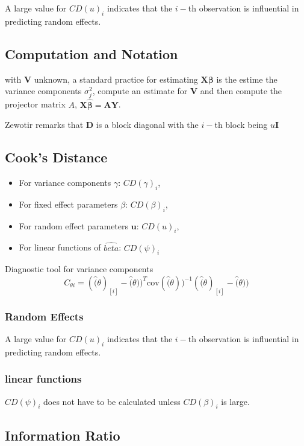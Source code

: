 \documentclass[Main.tex]{subfiles}
\begin{document}
	A large value for $CD(u)_i$ indicates that the $i-$th observation is influential in predicting random effects.
	

	
	\newpage
	\subsection{Computation and Notation } %
	with $\boldsymbol{V}$ unknown, a standard practice for estimating $\boldsymbol{X \beta}$ is the estime the variance components $\sigma^2_j$,
	compute an estimate for $\boldsymbol{V}$ and then compute the projector matrix $A$, $\boldsymbol{X \hat{\beta}}  = \boldsymbol{AY}$.
	
	
	Zewotir remarks that $\boldsymbol{D}$ is a block diagonal with the $i-$th block being $u \boldsymbol{I}$


	

\subsection{Cook's Distance}
\begin{itemize}
	\item For variance components $\gamma$: $CD(\gamma)_i$,
	\item For fixed effect parameters $\beta$: $CD(\beta)_i$,
	\item For random effect parameters $\boldsymbol{u}$: $CD(u)_i$,
	\item For linear functions of $\hat{beta}$: $CD(\psi)_i$
\end{itemize}
	Diagnostic tool for variance components
	\[ C_{\theta i} =(\hat(\theta)_{[i]} - \hat(\theta))^{T}\mbox{cov}( \hat(\theta))^{-1}(\hat(\theta)_{[i]} - \hat(\theta))\]

\newpage
\subsubsection{Random Effects}

A large value for $CD(u)_i$ indicates that the $i-$th observation is influential in predicting random effects.

\subsubsection{linear functions}

$CD(\psi)_i$ does not have to be calculated unless $CD(\beta)_i$ is large.


\subsection{Information Ratio}




\printindex


\end{document}

